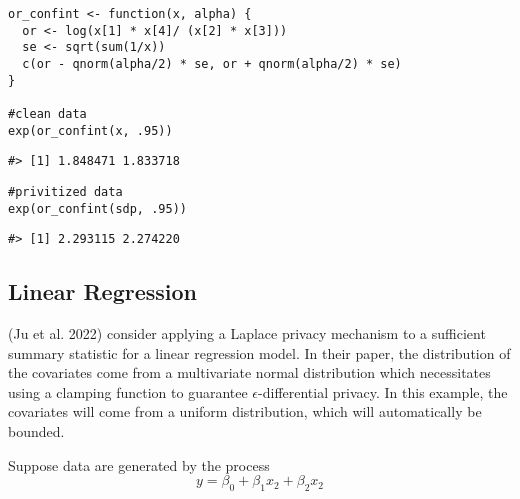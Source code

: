 \begin{verbatim}
or_confint <- function(x, alpha) {
  or <- log(x[1] * x[4]/ (x[2] * x[3]))
  se <- sqrt(sum(1/x))
  c(or - qnorm(alpha/2) * se, or + qnorm(alpha/2) * se)
}

#clean data
exp(or_confint(x, .95))
\end{verbatim}

\begin{verbatim}
#> [1] 1.848471 1.833718
\end{verbatim}

\begin{verbatim}
#privitized data
exp(or_confint(sdp, .95))
\end{verbatim}

\begin{verbatim}
#> [1] 2.293115 2.274220
\end{verbatim}

\hypertarget{linear-regression}{%
\subsection{Linear Regression}\label{linear-regression}}

(Ju et al. 2022) consider applying a Laplace privacy
mechanism to a sufficient summary statistic for a linear regression model.
In their paper, the distribution of the covariates come from a multivariate normal
distribution which necessitates using a clamping function to guarantee
\(\epsilon\)-differential privacy. In this example, the covariates will come
from a uniform distribution, which will automatically be bounded.

Suppose data are generated by the process
\[
y = \beta_0 + \beta_1x_2 + \beta_2x_2
\]

